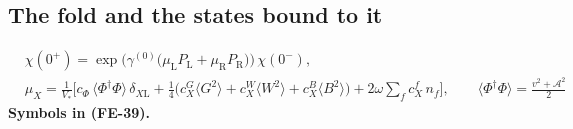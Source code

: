 \documentclass[
  10pt,
]{article}
\begin{document}
\hypertarget{the-fold-and-the-states-bound-to-it}{%
\subsection{The fold and the states bound to
it}\label{the-fold-and-the-states-bound-to-it}}

\[
\begin{aligned}
&\chi(0^+) = \exp\Big(\gamma^{(0)}\big(\mu_{\mathrm{L}}P_{\mathrm{L}} + \mu_{\mathrm{R}}P_{\mathrm{R}}\big)\Big)\,\chi(0^-),\\
&\mu_X = \frac{1}{V_*}\Big[c_\Phi\,\langle\Phi^\dagger\Phi\rangle\,\delta_{X\mathrm{L}} + \frac14\big(c^{G}_X\langle G^2\rangle
 + c^{W}_X\langle W^2\rangle + c^{B}_X\langle B^2\rangle\big) + 2\omega\sum_f c^{f}_X\,n_f\Big],\qquad
 \langle\Phi^\dagger\Phi\rangle = \frac{v^2 + \mathcal{A}^2}{2}
\end{aligned} \tag{FE-39}
\] \textbf{Symbols in (FE-39).}
\end{document}

